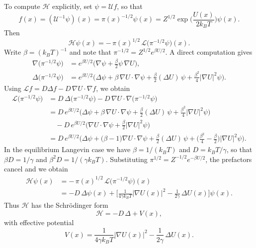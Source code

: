 \documentclass[11pt]{article}
\begin{document}
To compute $\mathcal H$ explicitly, set $\psi = \mathcal U f$, so that
\begin{equation}
f(x) = (\mathcal U^{-1}\psi)(x)
=
\pi(x)^{-1/2}\psi(x)
=
Z^{1/2}\exp\!\Big(\frac{U(x)}{2k_B T}\Big)\psi(x).
\end{equation}
Then
\begin{equation}
\mathcal H\psi(x)
=
-\,\pi(x)^{1/2}\,\mathcal L\big(\pi^{-1/2}\psi\big)(x).
\end{equation}
Write $\beta = (k_B T)^{-1}$ and note that $\pi^{-1/2} = Z^{1/2}e^{\beta U/2}$. A direct computation gives
\begin{align}
\nabla\big(\pi^{-1/2}\psi\big)
&=
e^{\beta U/2}\Big(\nabla\psi + \tfrac{\beta}{2}\psi\,\nabla U\Big), \\[0.3em]
\Delta\big(\pi^{-1/2}\psi\big)
&=
e^{\beta U/2}\Big(
\Delta\psi
+
\beta\,\nabla U\cdot\nabla\psi
+
\tfrac{\beta}{2}(\Delta U)\,\psi
+
\tfrac{\beta^2}{4}|\nabla U|^2 \psi
\Big).
\end{align}
Using $\mathcal L f = D\Delta f - D\,\nabla U\cdot\nabla f$, we obtain
\begin{align}
\mathcal L\big(\pi^{-1/2}\psi\big)
&=
D\,\Delta\big(\pi^{-1/2}\psi\big)
-
D\,\nabla U\cdot\nabla\big(\pi^{-1/2}\psi\big) \\[0.3em]
&=
D\,e^{\beta U/2}\Big(
\Delta\psi
+
\beta\,\nabla U\cdot\nabla\psi
+
\tfrac{\beta}{2}(\Delta U)\,\psi
+
\tfrac{\beta^2}{4}|\nabla U|^2 \psi
\Big) \\[0.3em]
&\quad
- D\,e^{\beta U/2}\Big(
\nabla U\cdot\nabla\psi
+
\tfrac{\beta}{2}|\nabla U|^2\psi
\Big) \\[0.3em]
&=
D\,e^{\beta U/2}\Big(
\Delta\psi
+
\Big(\beta-1\Big)\nabla U\cdot\nabla\psi
+
\tfrac{\beta}{2}(\Delta U)\,\psi
+
\Big(\tfrac{\beta^2}{4}-\tfrac{\beta}{2}\Big)|\nabla U|^2 \psi
\Big).
\end{align}
In the equilibrium Langevin case we have $\beta = 1/(k_B T)$ and $D = k_B T/\gamma$, so that $\beta D = 1/\gamma$ and $\beta^2 D = 1/(\gamma k_B T)$. Substituting $\pi^{1/2} = Z^{-1/2}e^{-\beta U/2}$, the prefactors cancel and we obtain
\begin{align}
\mathcal H\psi(x)
&=
-\,\pi(x)^{1/2}\,\mathcal L\big(\pi^{-1/2}\psi\big)(x) \\[0.3em]
&=
- D\,\Delta\psi(x)
+
\Big[
\frac{1}{4\gamma k_B T}|\nabla U(x)|^2
-
\frac{1}{2\gamma}\,\Delta U(x)
\Big]\psi(x).
\end{align}
Thus $\mathcal H$ has the Schr\"odinger form
\begin{equation}
\mathcal H
=
- D\,\Delta + V(x),
\end{equation}
with effective potential
\begin{equation}
V(x)
=
\frac{1}{4\gamma k_B T}|\nabla U(x)|^2
-
\frac{1}{2\gamma}\,\Delta U(x).
\end{equation}
\end{document}
